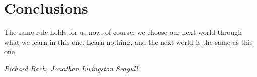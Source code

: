 \documentclass[class=report,11pt,crop=false]{standalone}
\begin{document}
\chapter{Conclusions}
\epigraph{The same rule holds for us now, of course: we choose our next world through what we learn in this one. Learn nothing, and the next world is the same as this one.}%
    {\emph{Richard Bach, Jonathan Livingston Seagull}}

\blindtext






\ifstandalone

\printnoidxglossary[type=\acronymtype,nonumberlist]
\fi
\end{document}
